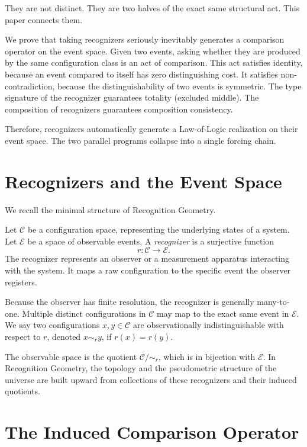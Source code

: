 \documentclass[11pt,a4paper]{article}
\theoremstyle{definition}
\theoremstyle{remark}
\begin{document}
They are not distinct. They are two halves of the exact same structural act. This paper connects them.

We prove that taking recognizers seriously inevitably generates a comparison operator on the event space. Given two events, asking whether they are produced by the same configuration class is an act of comparison. This act satisfies identity, because an event compared to itself has zero distinguishing cost. It satisfies non-contradiction, because the distinguishability of two events is symmetric. The type signature of the recognizer guarantees totality (excluded middle). The composition of recognizers guarantees composition consistency.

Therefore, recognizers automatically generate a Law-of-Logic realization on their event space. The two parallel programs collapse into a single forcing chain.

\section{Recognizers and the Event Space}

We recall the minimal structure of Recognition Geometry.

Let $\mathcal{C}$ be a configuration space, representing the underlying states of a system. Let $\mathcal{E}$ be a space of observable events. A \emph{recognizer} is a surjective function
\[
r : \mathcal{C} \to \mathcal{E}.
\]
The recognizer represents an observer or a measurement apparatus interacting with the system. It maps a raw configuration to the specific event the observer registers.

Because the observer has finite resolution, the recognizer is generally many-to-one. Multiple distinct configurations in $\mathcal{C}$ may map to the exact same event in $\mathcal{E}$. We say two configurations $x, y \in \mathcal{C}$ are observationally indistinguishable with respect to $r$, denoted $x \sim_r y$, if $r(x) = r(y)$.

The observable space is the quotient $\mathcal{C} / \sim_r$, which is in bijection with $\mathcal{E}$. In Recognition Geometry, the topology and the pseudometric structure of the universe are built upward from collections of these recognizers and their induced quotients.

\section{The Induced Comparison Operator}
\end{document}
